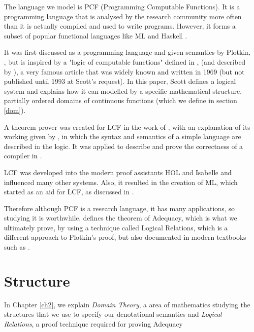 The language we model is PCF (Programming Computable Functions). It is a programming language that is analysed by the research community more often than it is actually compiled and used to write programs. However, it forms a subset of popular functional languages like ML \citep{Milner97} and Haskell \citep{Marlow10}.

It was first discussed as a programming language and given semantics by Plotkin, \citep{Plotkin77}, but is inspired by a "logic of computable functions" defined in \citep{Scott93}, (and described by \citep{Milner73}), a very famous article that was widely known and written in 1969 (but not published until 1993 at Scott's request). In this paper, Scott defines a logical system and explains how it can modelled by a specific mathematical structure, partially ordered domains of continuous functions (which we define in section \ref{dom}).

A theorem prover was created for LCF in the work of \citep{Milner72a}, with an explanation of its working given by \citep{Milner72b}, in which the syntax and semantics of a simple language are described in the logic. It was applied to  describe and prove the correctness of a compiler in \citep{Milner72c}.

LCF was developed into the modern proof assistants HOL and Isabelle \citep{Nipkow02} and influenced many other systems. Also, it resulted in the creation of ML, which started as an aid for LCF, as discussed in \citep{Gordon00}.

Therefore although PCF is a research language, it has many applications, so studying it is worthwhile. \citep{Plotkin77} defines the theorem of Adequacy, which is what we ultimately prove, by using a technique called Logical Relations, which is a different approach to Plotkin's proof, but also documented in modern textbooks such as \citep{Streicher06}. 

%

\section{Structure}
In Chapter \ref{ch2}, we explain \emph{Domain Theory}, a area of mathematics studying the structures that we use to specify our denotational semantics and \emph{Logical Relations}, a proof technique required for proving Adequacy

